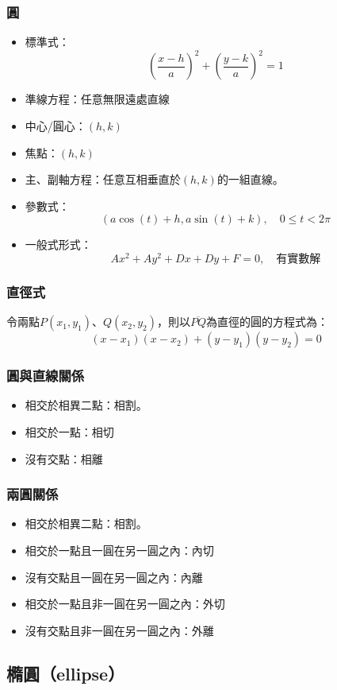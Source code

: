 \documentclass[a4paper,12pt]{report}
\begin{document}
\subsubsection{圓}
\begin{itemize}
\item 標準式：
\[\left(\frac{x-h}{a}\right)^2+\left(\frac{y-k}{a}\right)^2=1\]
\item 準線方程：任意無限遠處直線
\item 中心/圓心：$(h,k)$
\item 焦點：$(h,k)$
\item 主、副軸方程：任意互相垂直於$(h,k)$的一組直線。
\item 參數式：
\[(a\cos(t)+h,a\sin(t)+k),\quad0\leq t<2\pi\]
\item 一般式形式：
\[Ax^2+Ay^2+Dx+Dy+F=0,\quad\text{有實數解}\]
\end{itemize}
\subsubsection{直徑式}
令兩點$P(x_1,y_1)$、$Q(x_2,y_2)$，則以$\overline{PQ}$為直徑的圓的方程式為：
\[(x-x_1)(x-x_2)+(y-y_1)(y-y_2)=0\]
\subsubsection{圓與直線關係}
\begin{itemize}
\item 相交於相異二點：相割。
\item 相交於一點：相切
\item 沒有交點：相離
\end{itemize}
\subsubsection{兩圓關係}
\begin{itemize}
\item 相交於相異二點：相割。
\item 相交於一點且一圓在另一圓之內：內切
\item 沒有交點且一圓在另一圓之內：內離
\item 相交於一點且非一圓在另一圓之內：外切
\item 沒有交點且非一圓在另一圓之內：外離
\end{itemize}
\subsection{橢圓（ellipse）}
\end{document}
